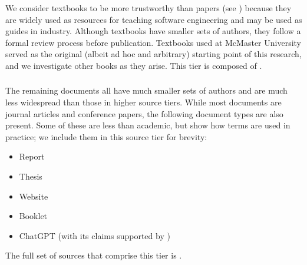\subsubsection{}
\label{texts}

We consider textbooks to be more trustworthy than papers (see )
because they are widely used as resources for teaching software engineering and
may be used as guides in industry.
Although textbooks have smaller sets of
authors, they follow a formal review process before publication. Textbooks used
at McMaster University \citep{Patton2006,PetersAndPedrycz2000,vanVliet2000}
served as the original (albeit ad hoc and arbitrary) starting point of this
research, and we investigate other books as they arise. \addTextEx{}
This tier is composed of .

\subsubsection{}
\label{papers}

The remaining documents all have much smaller sets of authors and are much less
widespread than those in higher source tiers. While most documents are
journal articles and conference papers, the following document types are also
present. Some of these are less than academic, but show how terms are used in
practice; we include them in this source tier for brevity:

\begin{itemize}
    \item Report \citep{Kam2008,Gerrard2000a,Gerrard2000b}
    \item Thesis \citep{Bas2024}
    \item Website \citep{LambdaTest2024,Pandey2023}
    \item Booklet \citep{SPICE2022}
    \item \ifnotpaper \else ChatGPT \fi \citet{ChatGPT2024} (with its claims
          supported by \citet{RusEtAl2008})
\end{itemize}

The full set of sources that comprise this tier is .

\ifnotpaper\else
    \begin{table*}[t!]
        \ieeeCatsTable{}
    \end{table*}
\fi

